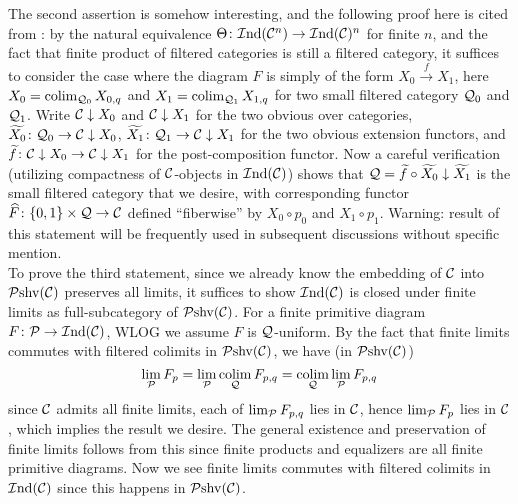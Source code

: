 \documentclass[twoside]{article}
\begin{document}
The second assertion is somehow interesting, and the following proof here is cited from \cite{KS06}: by the natural equivalence $\Theta\colon \mathcal{I}\mathrm{nd}({\mathcal{C}}^n) \rightarrow \mathcal{I}\mathrm{nd}({\mathcal{C}})^n$ for finite $n$, and the fact that finite product of filtered categories is still a filtered category, it suffices to consider the case where the diagram $F$ is simply of the form $X_0 \xrightarrow{f} X_1$, here $X_0 = \operatorname*{\mathrm{colim}}_{{\mathcal{Q}}_0} X_{0,q}$ and $X_1 = \operatorname*{\mathrm{colim}}_{{\mathcal{Q}}_1} X_{1, q}$ for two small filtered category ${\mathcal{Q}}_0$ and ${\mathcal{Q}}_1$. Write ${\mathcal{C}} \downarrow X_0$ and ${\mathcal{C}} \downarrow X_1$ for the two obvious over categories,  $\widetilde{X_0}\colon {\mathcal{Q}}_0 \rightarrow {\mathcal{C}}\downarrow X_0$, $\widetilde{X_1}\colon {\mathcal{Q}}_1 \rightarrow {\mathcal{C}}\downarrow X_1$ for the two obvious extension functors, and $\widetilde{f}\colon {\mathcal{C}} \downarrow X_0 \rightarrow {\mathcal{C}}\downarrow X_1$ for the post-composition functor. Now a careful verification (utilizing compactness of ${\mathcal{C}}$-objects in $\mathcal{I}\mathrm{nd}({\mathcal{C}})$) shows that 
${\mathcal{Q}} = \widetilde{f} \circ \widetilde{X_0} \downarrow \widetilde{X_1}$
is the small filtered category that we desire, with corresponding functor $\widehat{F}\colon \{0,1\}\times {\mathcal{Q}} \rightarrow {\mathcal{C}}$ defined ``fiberwise'' by $X_0 \circ p_0$ and $X_1 \circ p_1$. Warning: result of this statement will be frequently used in subsequent discussions without specific mention.\\

To prove the third statement, since we already know the embedding of ${\mathcal{C}}$ into $\mathcal{P}\mathrm{shv}({\mathcal{C}})$ preserves all limits, it suffices to show $\mathcal{I}\mathrm{nd}({\mathcal{C}})$ is closed under finite limits as full-subcategory of $\mathcal{P}\mathrm{shv}({\mathcal{C}})$. For a finite primitive diagram $F\colon {\mathcal{P}} \rightarrow \mathcal{I}\mathrm{nd}({\mathcal{C}})$, WLOG we assume $F$ is ${\mathcal{Q}}$-uniform. By the fact that finite limits commutes with filtered colimits in $\mathcal{P}\mathrm{shv}({\mathcal{C}})$, we have (in $\mathcal{P}\mathrm{shv}({\mathcal{C}})$)
$$\lim_{\mathcal{P}} F_p = \lim_{\mathcal{P}} \operatorname*{\mathrm{colim}}_{\mathcal{Q}} F_{p,q} = \operatorname*{\mathrm{colim}}_{\mathcal{Q}} \lim_{\mathcal{P}} F_{p,q}$$
since ${\mathcal{C}}$ admits all finite limits, each of $\lim_{\mathcal{P}} F_{p,q}$ lies in ${\mathcal{C}}$, hence $\lim_{\mathcal{P}} F_p$ lies in ${\mathcal{C}}$, which implies the result we desire. The general existence and preservation of finite limits follows from this since finite products and equalizers are all finite primitive diagrams.  Now we see finite limits commutes with filtered colimits in $\mathcal{I}\mathrm{nd}({\mathcal{C}})$ since this happens in $\mathcal{P}\mathrm{shv}({\mathcal{C}})$.\\
\end{document}
